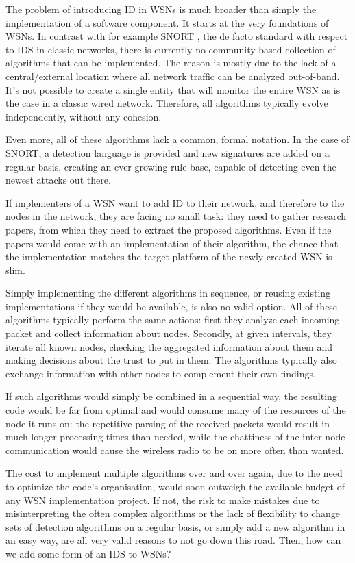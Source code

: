 \documentclass[conference]{IEEEtran}
\begin{document}
The problem of introducing ID in WSNs is much broader than simply the
implementation of a software component. It starts at the very foundations of
WSNs. In contrast with for example SNORT \cite{roesch1999snort}, the de facto
standard with respect to IDS in classic networks, there is currently no
community based collection of algorithms that can be implemented. The reason is
mostly due to the lack of a central/external location where all network traffic
can be analyzed out-of-band. It's not possible to create a single entity that
will monitor the entire WSN as is the case in a classic wired network.
Therefore, all algorithms typically evolve independently, without any cohesion.

Even more, all of these algorithms lack a common, formal notation. In the case
of SNORT, a detection language is provided and new signatures are added on a
regular basis, creating an ever growing rule base, capable of detecting even
the newest attacks out there.

If implementers of a WSN want to add ID to their network, and therefore to the
nodes in the network, they are facing no small task: they need to gather
research papers, from which they need to extract the proposed algorithms. Even
if the papers would come with an implementation of their algorithm, the chance
that the implementation matches the target platform of the newly created WSN is
slim.

Simply implementing the different algorithms in sequence, or reusing existing
implementations if they would be available, is also no valid option. All of
these algorithms typically perform the same actions: first they analyze each
incoming packet and collect information about nodes. Secondly, at given
intervals, they iterate all known nodes, checking the aggregated information
about them and making decisions about the trust to put in them. The algorithms
typically also exchange information with other nodes to complement their own
findings.

If such algorithms would simply be combined in a sequential way, the resulting
code would be far from optimal and would consume many of the resources of the
node it runs on: the repetitive parsing of the received packets would result in
much longer processing times than needed, while the chattiness of the
inter-node communication would cause the wireless radio to be on more often
than wanted.

The cost to implement multiple algorithms over and over again, due to the need
to optimize the code's organisation, would soon outweigh the available budget
of any WSN implementation project. If not, the risk to make mistakes due to
misinterpreting the often complex algorithms or the lack of flexibility to
change sets of detection algorithms on a regular basis, or simply add a new
algorithm in an easy way, are all very valid reasons to not go down this road.
Then, how can we add some form of an IDS to WSNs?
\end{document}
